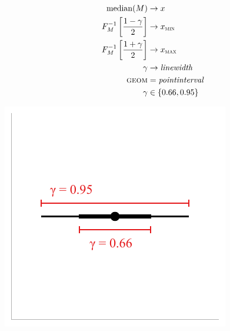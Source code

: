 \documentclass[journal]{vgtc}              %
\begin{document}
\noindent
\begin{minipage}{.5\columnwidth}

\begin{align*}
\operatorname{median}(M) &\rightarrow x\\
F_M^{-1}\left[\frac{1 - \gamma}{2}\right] &\rightarrow x_\textsc{min}\\
F_M^{-1}\left[\frac{1 + \gamma}{2}\right] &\rightarrow x_\textsc{max}\\
\gamma &\rightarrow \mathit{linewidth}\\
\textsc{geom} &= \mathit{pointinterval}\\
\gamma &\in \{0.66, 0.95\}
\end{align*}
\end{minipage}%
  \begin{minipage}{.4\columnwidth}
    \centering
    \includegraphics[width=1.2\columnwidth]{figs/3-stat_pointinterval_linewidth.pdf}
  \end{minipage}
\hfill\break
\end{document}

